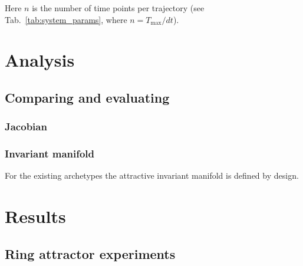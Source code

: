 \documentclass{article}
\theoremstyle{definition} \newtheorem{definition}{Definition}  \newtheorem{example}{Example}
\theoremstyle{remark} \newtheorem{remark}{Remark}
\newcounter{ct}
\begin{document}
Here $n$ is the number of time points per trajectory (see Tab.~\ref{tab:system_params}, where $n= T_{\text{max}}/dt$). 

\newpage
\section{Analysis}

\subsection{Comparing and evaluating}

\subsubsection{Jacobian}


\subsubsection{Invariant manifold}
For the existing archetypes the attractive invariant manifold is defined by design.


%




\newpage
\section{Results}
\subsection{Ring attractor experiments}
\end{document}
